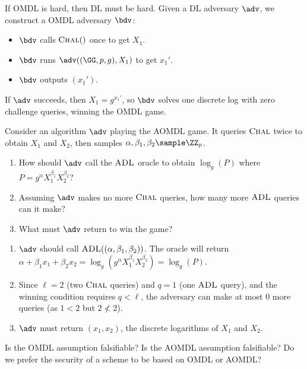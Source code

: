 \ifsolutions
\begin{mysolution}
  If OMDL is hard, then DL must be hard.
  Given a \ppt DL adversary $\adv$, we construct a \ppt OMDL adversary $\bdv$:
  \begin{itemize}
    \item $\bdv$ calls ${\normalfont\textsc{Chal}}()$ once to get $X_1$.
    \item $\bdv$ runs $\adv(\gparam, X_1)$ to get $x_1'$.
    \item $\bdv$ outputs $(x_1')$.
  \end{itemize}
  If $\adv$ succeeds, then $X_1 = g^{x_1'}$, so $\bdv$ solves one discrete log with zero challenge queries, winning the OMDL game.
\end{mysolution}
\fi

\begin{exercise}
  Consider an algorithm $\adv$ playing the AOMDL game. It queries ${\normalfont\textsc{Chal}}$ twice to obtain $X_1$ and $X_2$, then samples $\alpha, \beta_1, \beta_2 \sample \ZZ_p$. 
  \begin{enumerate}
    \item How should $\adv$ call the ${\normalfont\textsc{ADL}}$ oracle to obtain $\log_g(P)$ where $P = g^\alpha X_1^{\beta_1} X_2^{\beta_2}$?
    \item Assuming $\adv$ makes no more ${\normalfont\textsc{Chal}}$ queries, how many more ${\normalfont\textsc{ADL}}$ queries can it make?
    \item What must $\adv$ return to win the game?
  \end{enumerate}
\end{exercise}

\ifsolutions
\begin{mysolution}
  \begin{enumerate}
    \item $\adv$ should call ${\normalfont\textsc{ADL}}((\alpha, \beta_1, \beta_2))$. The oracle will return $\alpha + \beta_1 x_1 + \beta_2 x_2 = \log_g(g^\alpha X_1^{\beta_1} X_2^{\beta_2}) = \log_g(P)$.
    \item Since $\ell = 2$ (two ${\normalfont\textsc{Chal}}$ queries) and $q = 1$ (one ${\normalfont\textsc{ADL}}$ query), and the winning condition requires $q < \ell$, the adversary can make at most 0 more queries (as $1 < 2$ but $2 \not< 2$).
    \item $\adv$ must return $(x_1, x_2)$, the discrete logarithms of $X_1$ and $X_2$.
  \end{enumerate}
\end{mysolution}
\fi

\begin{exercise}
  Is the OMDL assumption falsifiable? Is the AOMDL assumption falsifiable? Do we prefer the security of a scheme to be based on OMDL or AOMDL?
\end{exercise}

